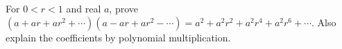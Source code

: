For $0<r<1$ and real $a$, prove $(a+ar+ar^2+\cdots)(a-ar+ar^2-\cdots)=a^2+a^2r^2+a^2r^4+a^2r^6+\cdots$. Also explain the coefficients by polynomial multiplication.
